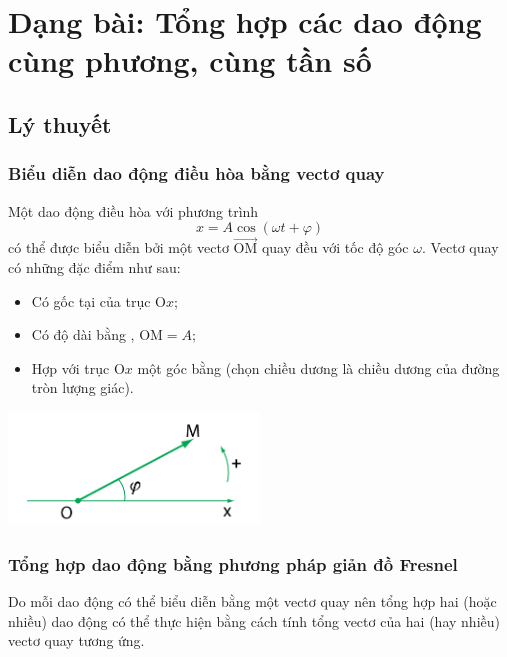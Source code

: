 \chapter[Dạng bài: Tổng hợp các dao động cùng phương, cùng tần số]{Dạng bài: Tổng hợp các dao động cùng phương, cùng tần số}
\section{Lý thuyết}
\subsection{Biểu diễn dao động điều hòa bằng vectơ quay }
Một dao động điều hòa với phương trình 
$$x=A\cos(\omega t+\varphi)$$
có thể được biểu diễn bởi một vectơ $\overrightarrow{\textrm{OM}}$ quay đều với tốc độ góc $\omega$. Vectơ quay có những đặc điểm như sau:
\begin{itemize}
	\item Có gốc tại  của trục $\textrm{O}x$; 
	\item Có độ dài bằng , $\textrm{OM}=A$;
	\item Hợp với trục $\textrm{O}x$ một góc bằng  (chọn chiều dương là chiều dương của đường tròn lượng giác).
\end{itemize}
\begin{center}
	\includegraphics[width=0.5\textwidth]{../figs/VN12-PH-06-A-004-1-V2-01.png}
\end{center}

\subsection{Tổng hợp dao động bằng phương pháp giản đồ Fresnel} 
Do mỗi dao động có thể biểu diễn bằng một vectơ quay nên tổng hợp hai (hoặc nhiều) dao động có thể thực hiện bằng cách tính tổng vectơ của hai (hay nhiều) vectơ quay tương ứng.


